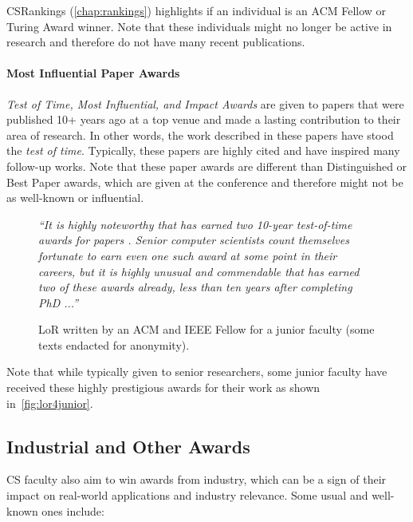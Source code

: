 \documentclass[oneside,11pt]{book}
\newenvironment{commentbox}[1][]{
  \small
  \begin{marker}[\faChessPawn{}]
    {\textbf{#1}}
  }{
  \end{marker}
}
\newenvironment{examplebox}[1][]{
  \small
  \begin{marker}[\faChessBishop{}]
    {\textbf{#1}}
  }{
  \end{marker}
}
\begin{document}
\begin{commentbox}
  CSRankings (\autoref{chap:rankings}) highlights if an individual is an ACM Fellow or Turing Award winner. Note that these individuals might no longer be active in research and therefore do not have many recent publications.
\end{commentbox}


\paragraph{Most Influential Paper Awards}
\emph{Test of Time, Most Influential, and Impact Awards}  are given to papers that were published 10+ years ago at a top venue and made a lasting contribution to their area of research. In other words, the work described in these papers have stood the \emph{test of time}. Typically, these papers are highly cited and have inspired many follow-up works.
Note that these paper awards are different than Distinguished or Best Paper awards, which are given at the conference and therefore might not be as well-known or influential.   

\begin{figure}
    \begin{examplebox}
      \emph{``It is highly noteworthy that  has earned two 10-year test-of-time awards for  papers . Senior computer scientists count themselves fortunate to
      earn even one such award at some point in their careers, but it is highly unusual and commendable that 
      has earned two of these awards already, less than ten years after completing  PhD ...''}\\

    \end{examplebox}
    \caption{LoR written by an ACM and IEEE Fellow for a junior faculty (some texts endacted for anonymity).}\label{fig:lor4junior}
  \end{figure}

  Note that while typically given to senior researchers, some junior faculty have received these highly prestigious awards for their work as shown in~\autoref{fig:lor4junior}. 

\subsection{Industrial and Other Awards}

CS faculty also aim to win awards from industry, which can be a sign of their impact on real-world applications and industry relevance. Some usual and well-known ones include:
\end{document}
